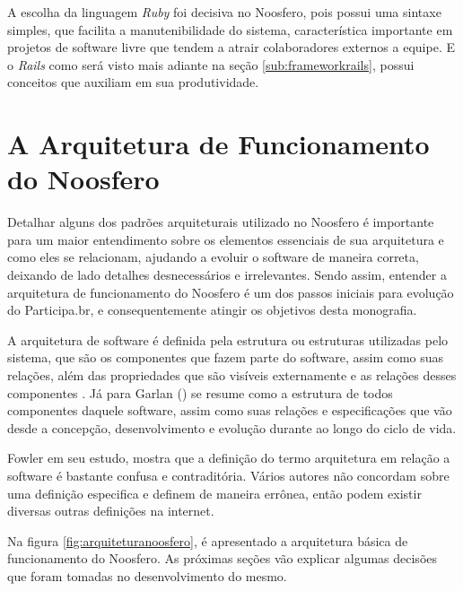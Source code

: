 A escolha da linguagem \textit{Ruby} foi decisiva no Noosfero, pois possui uma sintaxe simples, que facilita a manutenibilidade do sistema, característica importante em projetos de software livre que tendem a atrair colaboradores externos a equipe. E o \textit{Rails} como será visto mais adiante na seção \ref{sub:frameworkrails}, possui conceitos que auxiliam em sua produtividade. \cite{meirelles2013metricas}

\section{A Arquitetura de Funcionamento do Noosfero}

Detalhar alguns dos padrões arquiteturais utilizado no Noosfero é importante para um maior entendimento sobre os elementos essenciais de sua arquitetura e como eles se relacionam, ajudando a evoluir o software de maneira correta, deixando de lado detalhes desnecessários e irrelevantes. Sendo assim, entender a arquitetura de funcionamento do Noosfero é um dos passos iniciais para evolução do Participa.br, e consequentemente atingir os objetivos desta monografia.

A arquitetura de software é definida pela estrutura ou estruturas utilizadas pelo sistema, que são os componentes que fazem parte do software, assim como suas relações, além das propriedades que são visíveis externamente e as relações desses componentes \cite{bass1998architecture}. Já para Garlan (\citeyear{garlan1995architecture}) se resume como a estrutura de todos componentes  daquele software, assim como suas relações e especificações que vão desde a concepção, desenvolvimento e evolução durante ao longo do ciclo de vida.


Fowler \citeyear{fowler2006padroes} em seu estudo, mostra que a definição do termo arquitetura em relação a software é bastante confusa e contraditória. Vários autores não concordam sobre uma definição especifica e definem de maneira errônea, então podem existir diversas outras definições na internet.

Na figura \ref{fig:arquiteturanoosfero}, é apresentado a arquitetura básica de funcionamento do Noosfero. As próximas seções vão explicar algumas decisões que foram tomadas no desenvolvimento do mesmo.


